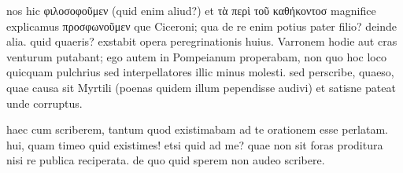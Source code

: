  nos hic φιλοσοφοῦμεν (quid enim aliud?) et τὰ περὶ τοῦ καθήκοντοσ magnifice explicamus προσφωνοῦμεν que Ciceroni; qua de re enim potius pater filio? deinde alia. quid quaeris? exstabit opera peregrinationis huius. Varronem hodie aut cras venturum putabant; ego autem in Pompeianum properabam, non quo hoc loco quicquam pulchrius sed interpellatores illic minus molesti. sed perscribe, quaeso, quae causa sit Myrtili (poenas quidem illum pependisse audivi) et satisne pateat unde corruptus.

 haec cum scriberem, tantum quod existimabam ad te orationem esse perlatam. hui, quam timeo quid existimes! etsi quid ad me? quae non sit foras proditura nisi re publica reciperata. de quo quid sperem non audeo scribere.
